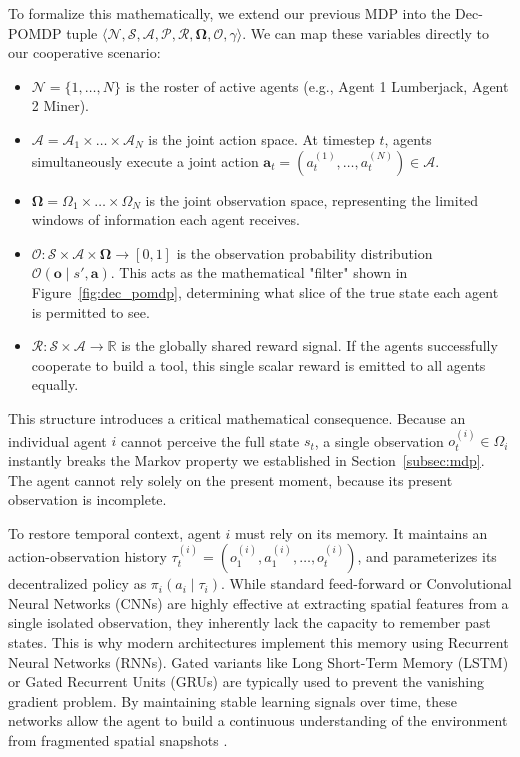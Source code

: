 To formalize this mathematically, we extend our previous MDP into the Dec-POMDP tuple $\langle \mathcal{N}, \mathcal{S}, \boldsymbol{\mathcal{A}}, \mathcal{P}, \mathcal{R}, \boldsymbol{\Omega}, \mathcal{O}, \gamma \rangle$. We can map these variables directly to our cooperative scenario:
\begin{itemize}
    \item $\mathcal{N} = \{1, \dots, N\}$ is the roster of active agents (e.g., Agent 1 Lumberjack, Agent 2 Miner).
    \item $\boldsymbol{\mathcal{A}} = \mathcal{A}_1 \times \dots \times \mathcal{A}_N$ is the joint action space. At timestep $t$, agents simultaneously execute a joint action $\mathbf{a}_t = (a_t^{(1)}, \dots, a_t^{(N)}) \in \boldsymbol{\mathcal{A}}$.
    \item $\boldsymbol{\Omega} = \Omega_1 \times \dots \times \Omega_N$ is the joint observation space, representing the limited windows of information each agent receives.
    \item $\mathcal{O}: \mathcal{S} \times \boldsymbol{\mathcal{A}} \times \boldsymbol{\Omega} \rightarrow [0, 1]$ is the observation probability distribution $\mathcal{O}(\mathbf{o} \mid s', \mathbf{a})$. This acts as the mathematical "filter" shown in Figure~\ref{fig:dec_pomdp}, determining what slice of the true state each agent is permitted to see.
    \item $\mathcal{R}: \mathcal{S} \times \boldsymbol{\mathcal{A}} \rightarrow \mathbb{R}$ is the globally shared reward signal. If the agents successfully cooperate to build a tool, this single scalar reward is emitted to all agents equally.
\end{itemize}

This structure introduces a critical mathematical consequence. Because an individual agent $i$ cannot perceive the full state $s_t$, a single observation $o_t^{(i)} \in \Omega_i$ instantly breaks the Markov property we established in Section~\ref{subsec:mdp}. The agent cannot rely solely on the present moment, because its present observation is incomplete. 

To restore temporal context, agent $i$ must rely on its memory. It maintains an action-observation history $\tau_t^{(i)} = (o_1^{(i)}, a_1^{(i)}, \dots, o_t^{(i)})$, and parameterizes its decentralized policy as $\pi_i(a_i \mid \tau_i)$. While standard feed-forward or Convolutional Neural Networks (CNNs) \parencite{Lecun_Bottou_Bengio_Haffner_1998} are highly effective at extracting spatial features from a single isolated observation, they inherently lack the capacity to remember past states. This is why modern architectures implement this memory using Recurrent Neural Networks (RNNs). Gated variants like Long Short-Term Memory (LSTM) \parencite{Hochreiter_Schmidhuber_1997} or Gated Recurrent Units (GRUs) \parencite{Chung_Gulcehre_Cho_Bengio_2014} are typically used to prevent the vanishing gradient problem. By maintaining stable learning signals over time, these networks allow the agent to build a continuous understanding of the environment from fragmented spatial snapshots \parencite{Hausknecht_Stone_2015}.

